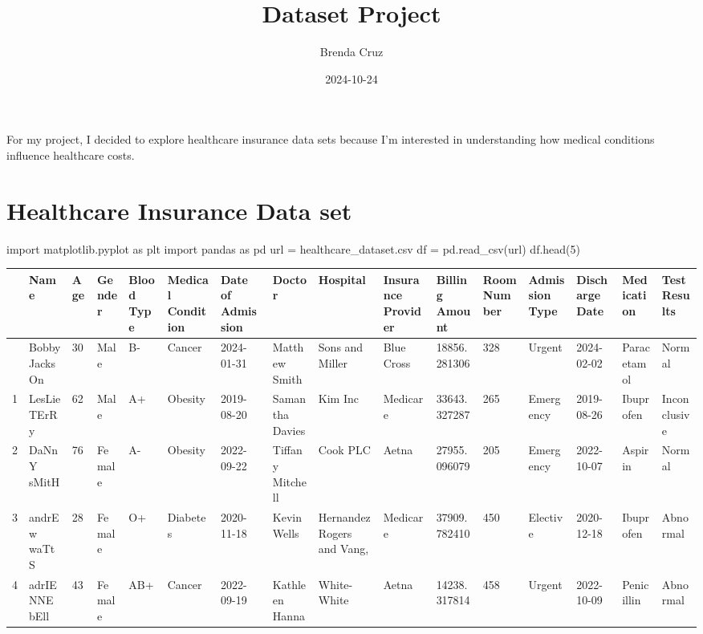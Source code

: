 \documentclass[
  letterpaper,
  DIV=11,
  numbers=noendperiod]{scrartcl}
\title{Dataset Project}
\author{Brenda Cruz}
\date{2024-10-24}
\newenvironment{Shaded}{\begin{snugshade}}{\end{snugshade}}
\newcommand{\DecValTok}[1]{\textcolor[rgb]{0.68,0.00,0.00}{#1}}
\newcommand{\ImportTok}[1]{\textcolor[rgb]{0.00,0.46,0.62}{#1}}
\newcommand{\NormalTok}[1]{\textcolor[rgb]{0.00,0.23,0.31}{#1}}
\newcommand{\OperatorTok}[1]{\textcolor[rgb]{0.37,0.37,0.37}{#1}}
\newcommand{\StringTok}[1]{\textcolor[rgb]{0.13,0.47,0.30}{#1}}
\renewcommand*\contentsname{Table of contents}
\newcommand\contentsname{Table of contents}
\begin{document}
\maketitle

\renewcommand*\contentsname{Table of contents}
{
\hypersetup{linkcolor=}
\setcounter{tocdepth}{3}
\tableofcontents
}
For my project, I decided to explore healthcare insurance data sets
because I'm interested in understanding how medical conditions influence
healthcare costs.

\section{Healthcare Insurance Data
set}\label{healthcare-insurance-data-set}

\begin{Shaded}
\begin{Highlighting}[]
\ImportTok{import}\NormalTok{ matplotlib.pyplot }\ImportTok{as}\NormalTok{ plt}
\ImportTok{import}\NormalTok{ pandas }\ImportTok{as}\NormalTok{ pd}
\NormalTok{url }\OperatorTok{=} \StringTok{\textquotesingle{}healthcare\_dataset.csv\textquotesingle{}}
\NormalTok{df }\OperatorTok{=}\NormalTok{ pd.read\_csv(url)}
\NormalTok{df.head(}\DecValTok{5}\NormalTok{)}
\end{Highlighting}
\end{Shaded}

\begin{longtable}[]{@{}llllllllllllllll@{}}
\toprule\noalign{}
& Name & Age & Gender & Blood Type & Medical Condition & Date of
Admission & Doctor & Hospital & Insurance Provider & Billing Amount &
Room Number & Admission Type & Discharge Date & Medication & Test
Results \\
\midrule\noalign{}
\endhead
\bottomrule\noalign{}
\endlastfoot
0 & Bobby JacksOn & 30 & Male & B- & Cancer & 2024-01-31 & Matthew Smith
& Sons and Miller & Blue Cross & 18856.281306 & 328 & Urgent &
2024-02-02 & Paracetamol & Normal \\
1 & LesLie TErRy & 62 & Male & A+ & Obesity & 2019-08-20 & Samantha
Davies & Kim Inc & Medicare & 33643.327287 & 265 & Emergency &
2019-08-26 & Ibuprofen & Inconclusive \\
2 & DaNnY sMitH & 76 & Female & A- & Obesity & 2022-09-22 & Tiffany
Mitchell & Cook PLC & Aetna & 27955.096079 & 205 & Emergency &
2022-10-07 & Aspirin & Normal \\
3 & andrEw waTtS & 28 & Female & O+ & Diabetes & 2020-11-18 & Kevin
Wells & Hernandez Rogers and Vang, & Medicare & 37909.782410 & 450 &
Elective & 2020-12-18 & Ibuprofen & Abnormal \\
4 & adrIENNE bEll & 43 & Female & AB+ & Cancer & 2022-09-19 & Kathleen
Hanna & White-White & Aetna & 14238.317814 & 458 & Urgent & 2022-10-09 &
Penicillin & Abnormal \\
\end{longtable}
\end{document}
